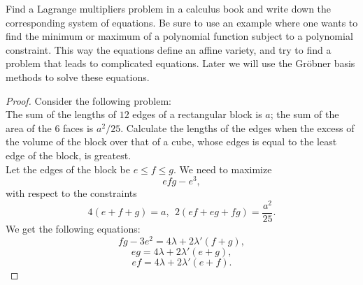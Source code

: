 \begin{exercise}{12}
    Find a Lagrange multipliers problem in a calculus book and write down the corresponding system of equations. Be sure to use an example where one wants to find the minimum or maximum of a polynomial function subject to a polynomial constraint. This way the equations define an affine variety, and try to find a problem that leads to complicated equations. Later we will use the Gr\"obner basis methods to solve these equations.
\end{exercise}
\begin{proof}
    Consider the following problem:\\

    The sum of the lengths of $12$ edges of a rectangular block is $a$; the sum of the area of the $6$ faces is $a^2/25$. Calculate the lengths of the edges when the excess of the volume of the block over that of a cube, whose edges is equal to the least edge of the block, is greatest.\\

    Let the edges of the block be $e\leq f\leq g$. We need to maximize
    $$efg - e^3,$$
    with respect to the constraints
    $$4(e+f+g) = a,~~2(ef + eg + fg) = \frac{a^2}{25}.$$
    We get the following equations:
    $$fg - 3e^2 = 4\lambda + 2\lambda' (f+g),$$
    $$eg = 4\lambda + 2\lambda' (e+g),$$
    $$ef = 4\lambda + 2\lambda' (e+f).$$
\end{proof}

